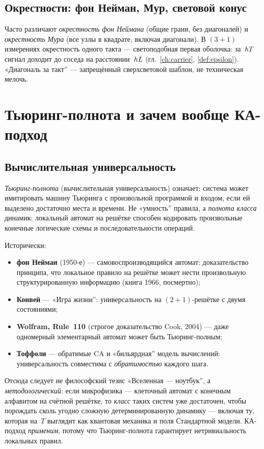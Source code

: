 \subsection{Окрестности: фон Нейман, Мур, световой конус}

Часто различают \emph{окрестность фон Неймана} (общие грани, без диагоналей)
и \emph{окрестность Мура} (все узлы в квадрате, включая диагонали).
В $(3{+}1)$ измерениях окрестность одного такта --- светоподобная первая оболочка:
за~$hT$ сигнал доходит до соседа на расстоянии~$hL$ (гл.~\ref{ch:carrier}, \cref{def:epsilon}).
«Диагональ за такт'' --- запрещённый сверхсветовой шаблон, не техническая мелочь.

\section{Тьюринг-полнота и зачем вообще КА-подход}
\label{sec:app-universality}

\subsection{Вычислительная универсальность}

\emph{Тьюринг-полнота} (вычислительная универсальность) означает:
система может имитировать машину Тьюринга с произвольной программой и входом,
если ей выделено достаточно места и времени.
Не «умность'' правила, а \emph{полнота класса} динамик: локальный автомат на решётке
способен кодировать произвольные конечные логические схемы и последовательности операций.

Исторически:
\begin{itemize}
\item \textbf{фон Нейман} (1950-е) --- самовоспроизводящийся автомат:
  доказательство принципа, что локальное правило на решётке может нести
  произвольную структурированную информацию (книга 1966, посмертно);
\item \textbf{Конвей} --- «Игра жизни'': универсальность на $(2{+}1)$-решётке с двумя состояниями;
\item \textbf{Wolfram, Rule~110} (строгое доказательство Cook, 2004) ---
  даже одномерный элементарный автомат может быть Тьюринг-полным;
\item \textbf{Тоффоли} --- обратимые CA и «бильярдная'' модель вычислений:
  универсальность совместима с \emph{обратимостью} каждого шага.
\end{itemize}

Отсюда следует не философский тезис «Вселенная --- ноутбук'',
а \emph{методологический}: если микрофизика --- клеточный автомат с конечным алфавитом
на счётной решётке, то \emph{класс} таких систем уже достаточен,
чтобы порождать сколь угодно сложную детерминированную динамику ---
включая ту, которая на~$T$ выглядит как квантовая механика и поля Стандартной модели.
КА-подход \emph{применим}, потому что Тьюринг-полнота гарантирует нетривиальность локальных правил.

